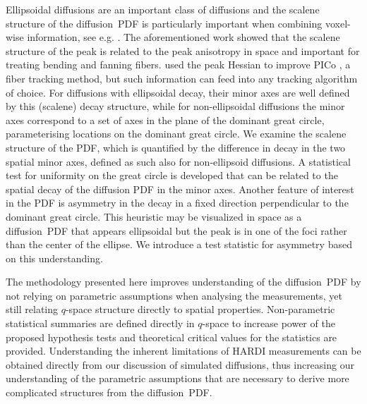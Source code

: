 \documentclass[dvips,aoas,preprint]{imsart}
\numberwithin{equation}{section}
\theoremstyle{plain}
\begin{document}
Ellipsoidal
diffusions are an important class of diffusions and the scalene structure of the
diffusion~PDF is particularly important when combining voxel-wise information, see e.g. \citep{Seunarine}.  The
aforementioned work showed that the scalene structure of the peak is
related to the peak anisotropy in space and important for treating
bending and fanning fibers.  \citet{Seunarine} used the peak Hessian to
improve PICo \citep{par-ale:pico}, a fiber tracking method, but such information can feed into
any tracking algorithm of choice.  For diffusions with ellipsoidal
decay, their minor axes are well defined by this (scalene) decay structure,
while for non-ellipsoidal diffusions the minor axes correspond to a
set of axes in the plane of the dominant great circle, parameterising
locations on the dominant great circle.  We examine the scalene
structure of the PDF, which is quantified by the difference in decay
in the two spatial minor axes, defined as such also for non-ellipsoid
diffusions.  
A statistical test for uniformity on the great circle is developed
that can be related to the spatial decay of the diffusion PDF in the
minor axes.  Another feature of interest in the PDF is asymmetry in the decay in
a fixed direction perpendicular to the dominant great circle.  This
heuristic may be visualized in space as a diffusion~PDF that appears
ellipsoidal but the peak is in one of the foci rather than the center
of the ellipse.  We introduce a test statistic for asymmetry based on
this understanding.


The methodology presented here improves understanding of the
diffusion~PDF by not relying on parametric assumptions when analysing
the measurements, yet still relating $q$-space structure directly to
spatial properties.  Non-parametric statistical summaries are defined
directly in $q$-space to increase power of the proposed hypothesis
tests and theoretical critical values for the statistics are provided.
Understanding the inherent limitations of HARDI measurements can be
obtained directly from our discussion of simulated diffusions, thus
increasing our understanding of the parametric assumptions that are
necessary to derive more complicated structures from the
diffusion~PDF.
\end{document}

